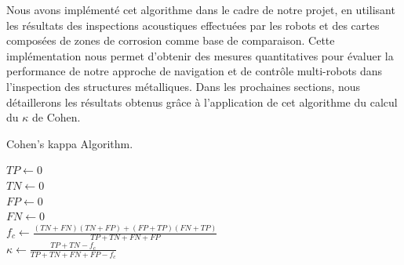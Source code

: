 \documentclass[francais,RandD]{rapportPFE}
\begin{document}
			Nous avons implémenté cet algorithme dans le cadre de notre projet, en utilisant les résultats des inspections acoustiques effectuées par les robots et des cartes composées de zones de corrosion comme base de comparaison.
			Cette implémentation nous permet d'obtenir des mesures quantitatives pour évaluer la performance de notre approche de navigation et de contrôle multi-robots dans l'inspection des structures métalliques.
			Dans les prochaines sections, nous détaillerons les résultats obtenus grâce à l'application de cet algorithme du calcul du $\kappa$ de Cohen.

			\begin{algorithm}[h!]
				\caption{Cohen's kappa Algorithm.}
				\label{alg:Cohen_Kappa}
				\KwResult{$\kappa \in [0, 1]$}
				$TP \gets 0$ \\
				$TN \gets 0$ \\
				$FP \gets 0$ \\
				$FN \gets 0$ \\
				$f_c \gets \frac{(TN + FN) (TN + FP) + (FP + TP) (FN + TP)}{TP + TN + FN +FP}$ \\
				$\kappa \gets \frac{TP + TN - f_c}{TP + TN + FN + FP - f_c}$
			\end{algorithm}
\end{document}
